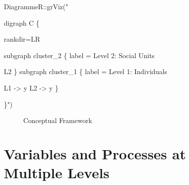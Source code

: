 \documentclass[
  letterpaper,
  DIV=11,
  numbers=noendperiod]{scrreprt}
\newenvironment{Shaded}{\begin{snugshade}}{\end{snugshade}}
\newcommand{\FunctionTok}[1]{\textcolor[rgb]{0.28,0.35,0.67}{#1}}
\newcommand{\NormalTok}[1]{\textcolor[rgb]{0.00,0.23,0.31}{#1}}
\newcommand{\SpecialCharTok}[1]{\textcolor[rgb]{0.37,0.37,0.37}{#1}}
\newcommand{\StringTok}[1]{\textcolor[rgb]{0.13,0.47,0.30}{#1}}
\begin{document}
\begin{Shaded}
\begin{Highlighting}[]
\NormalTok{DiagrammeR}\SpecialCharTok{::}\FunctionTok{grViz}\NormalTok{(}\StringTok{"}

\StringTok{digraph C \{}

\StringTok{rankdir=\textquotesingle{}LR\textquotesingle{}}

\StringTok{    subgraph cluster\_2 \{}
\StringTok{    }
\StringTok{    label = \textquotesingle{}Level 2: Social Units\textquotesingle{}}

\StringTok{  L2 }
\StringTok{  }
\StringTok{    \}}
\StringTok{    }
\StringTok{    subgraph cluster\_1 \{}
\StringTok{    }
\StringTok{    label = \textquotesingle{}Level 1: Individuals\textquotesingle{}}

\StringTok{  L1 {-}\textgreater{} y}
\StringTok{  L2 {-}\textgreater{} y}
\StringTok{    \}  }
\StringTok{    }

\StringTok{\}"}\NormalTok{)}
\end{Highlighting}
\end{Shaded}

\begin{figure}

{\centering 

}

\caption{\label{fig-conceptual}Conceptual Framework}

\end{figure}

\hypertarget{variables-and-processes-at-multiple-levels}{%
\section{Variables and Processes at Multiple
Levels}\label{variables-and-processes-at-multiple-levels}}
\end{document}
